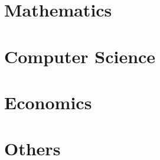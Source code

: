 



\part{Mathematics}

%
%

%


\part{Computer Science}
%


\part{Economics}
%


%
%
%

\part{Others}
%


